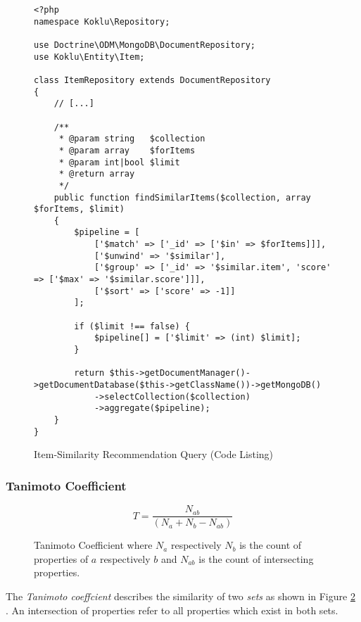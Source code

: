 \begin{figure}[!ht]
    \begin{verbatim}
<?php
namespace Koklu\Repository;

use Doctrine\ODM\MongoDB\DocumentRepository;
use Koklu\Entity\Item;

class ItemRepository extends DocumentRepository
{
    // [...]

    /**
     * @param string   $collection
     * @param array    $forItems
     * @param int|bool $limit
     * @return array
     */
    public function findSimilarItems($collection, array $forItems, $limit)
    {
        $pipeline = [
            ['$match' => ['_id' => ['$in' => $forItems]]],
            ['$unwind' => '$similar'],
            ['$group' => ['_id' => '$similar.item', 'score' => ['$max' => '$similar.score']]],
            ['$sort' => ['score' => -1]]
        ];

        if ($limit !== false) {
            $pipeline[] = ['$limit' => (int) $limit];
        }

        return $this->getDocumentManager()->getDocumentDatabase($this->getClassName())->getMongoDB()
            ->selectCollection($collection)
            ->aggregate($pipeline);
    }
}
    \end{verbatim}
    \caption{Item-Similarity Recommendation Query (Code Listing)}
    \label{fig:implementation-itemsimilarity-recommendation-query}
\end{figure}

\subsubsection{Tanimoto Coefficient}

\begin{figure}[ht]
    \[T = \frac{N_{ab}}{(N_a + N_b - N_{ab})}\]
    \caption[Tanimoto Coefficient]{Tanimoto Coefficient where \(N_a\) respectively \(N_b\) is the count of properties of \(a\) respectively \(b\) and \(N_{ab}\) is the count of intersecting properties.}
    \label{fig:implementation-itemsimilarity-tanimoto}
\end{figure}

The \emph{Tanimoto coeffcient} describes the similarity of two \emph{sets} as shown in Figure \ref{fig:implementation-itemsimilarity-tanimoto} \cite{segaran07}. An intersection of properties refer to all properties which exist in both sets.

